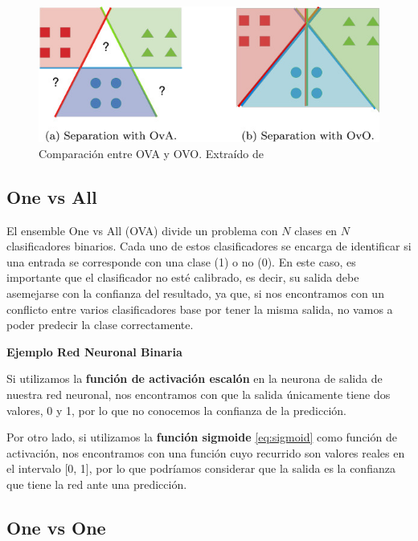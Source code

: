 \begin{figure}
    \centering
    \includegraphics[]{img/3/ova-ovo.jpg}
    \caption{Comparación entre OVA y OVO. Extraído de \cite{OVA_vs_OVO}}
    \label{fig:ova-ovo}
\end{figure}


\hypertarget{one-vs-all}{%
\subsection{One vs All}\label{one-vs-all}}

El ensemble One vs All (OVA) divide un problema con $N$ clases en $N$
clasificadores binarios. Cada uno de estos clasificadores se encarga de
identificar si una entrada se corresponde con una clase (1) o no (0). En
este caso, es importante que el clasificador no esté calibrado, es decir,
su salida debe asemejarse con la confianza del resultado, ya que, si nos
encontramos con un conflicto entre varios clasificadores base por tener
la misma salida, no vamos a poder predecir la clase correctamente.

\textbf{Ejemplo Red Neuronal Binaria}

Si utilizamos la \textbf{función de activación escalón} en la neurona de
salida de nuestra red neuronal, nos encontramos con que la salida
únicamente tiene dos valores, 0 y 1, por lo que no conocemos la
confianza de la predicción.

Por otro lado, si utilizamos la \textbf{función sigmoide} \eqref{eq:sigmoid} como función
de activación, nos encontramos con una función cuyo recurrido son
valores reales en el intervalo {[}0, 1{]}, por lo que podríamos
considerar que la salida es la confianza que tiene la red ante una
predicción.

\hypertarget{one-vs-one}{%
\subsection{One vs One}\label{one-vs-one}}

